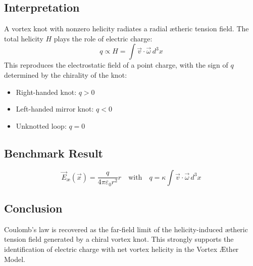 \subsection*{Interpretation}
A vortex knot with nonzero helicity radiates a radial ætheric tension field. The total helicity $H$ plays the role of electric charge:
\[
q \propto H = \int \vec{v} \cdot \vec{\omega} \, d^3x
\]
This reproduces the electrostatic field of a point charge, with the sign of $q$ determined by the chirality of the knot:
\begin{itemize}
    \item Right-handed knot: $q > 0$
    \item Left-handed mirror knot: $q < 0$
    \item Unknotted loop: $q = 0$
\end{itemize}

\subsection*{Benchmark Result}
\[
\boxed{
\vec{E}_\text{\ae}(\vec{x}) =
\frac{q}{4\pi \varepsilon_0 r^2} \hat{r}
\quad \text{with} \quad
q = \kappa \int \vec{v} \cdot \vec{\omega} \, d^3x
}
\]

\subsection*{Conclusion}
Coulomb's law is recovered as the far-field limit of the helicity-induced ætheric tension field generated by a chiral vortex knot. This strongly supports the identification of electric charge with net vortex helicity in the Vortex Æther Model.

